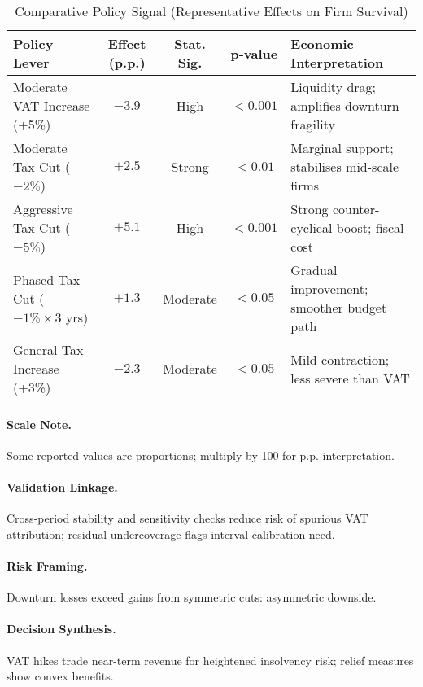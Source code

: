 \begin{table}[htbp]
\centering
\small
\caption{Comparative Policy Signal (Representative Effects on Firm Survival)}
\label{tab:comparative_policy_signal}
\setlength{\tabcolsep}{4pt}
\renewcommand{\arraystretch}{1.1}
\begin{tabular}{|p{3.2cm}|c|c|c|p{3.6cm}|}
\hline
\textbf{Policy Lever} & \textbf{Effect (p.p.)} & \textbf{Stat. Sig.} & \textbf{p-value} & \textbf{Economic Interpretation} \\
\hline
Moderate VAT Increase (+5\%) & $-3.9$ & High & $<0.001$ & Liquidity drag; amplifies downturn fragility \\
\hline
Moderate Tax Cut ($-2\%$) & $+2.5$ & Strong & $<0.01$ & Marginal support; stabilises mid-scale firms \\
\hline
Aggressive Tax Cut ($-5\%$) & $+5.1$ & High & $<0.001$ & Strong counter-cyclical boost; fiscal cost \\
\hline
Phased Tax Cut ($-1\%\times3$ yrs) & $+1.3$ & Moderate & $<0.05$ & Gradual improvement; smoother budget path \\
\hline
General Tax Increase (+3\%) & $-2.3$ & Moderate & $<0.05$ & Mild contraction; less severe than VAT \\
\hline
\end{tabular}
\end{table}

\paragraph{Scale Note.} Some reported values are proportions; multiply by 100 for p.p. interpretation.

\paragraph{Validation Linkage.} Cross-period stability and sensitivity checks reduce risk of spurious VAT attribution; residual undercoverage flags interval calibration need.

\paragraph{Risk Framing.} Downturn losses exceed gains from symmetric cuts: asymmetric downside.

\paragraph{Decision Synthesis.} VAT hikes trade near-term revenue for heightened insolvency risk; relief measures show convex benefits.

